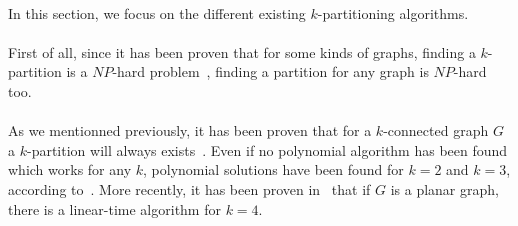 \paragraph{}
In this section, we focus on the different existing
$k$-partitioning algorithms.

\paragraph{}
First of all, since it has been proven that for some kinds of graphs, finding a
$k$-partition is a $NP$-hard problem~\cite{BF06}, finding a partition for any
graph is $NP$-hard too.

\paragraph{}
As we mentionned previously, it has been proven that for a $k$-connected graph
$G$ a $k$-partition will always exists~\cite{GE78,LL77}. Even if no polynomial
algorithm has been found which works for any $k$, polynomial solutions have
been found for $k=2$\cite{Suzuki1990227} and $k=3$\cite{Wada1994}, according to~\cite{JS94}. More recently, it has
been proven in~\cite{Nakano1997315} that if $G$ is a planar graph, there is a
linear-time algorithm for $k = 4$.


